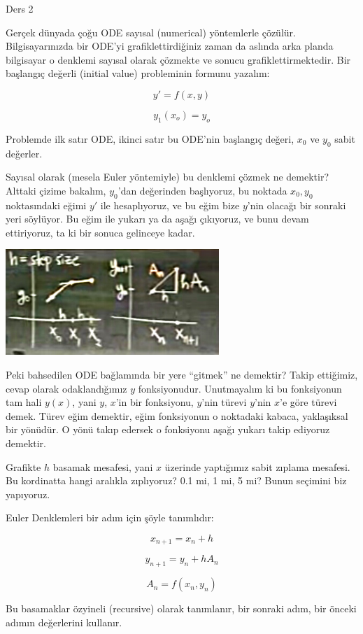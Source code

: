 \documentclass[12pt,fleqn]{article}\usepackage{../../common}
\begin{document}
Ders 2

Gerçek dünyada çoğu ODE sayısal (numerical) yöntemlerle
çözülür. Bilgisayarınızda bir ODE'yi grafiklettirdiğiniz zaman da aslında arka
planda bilgisayar o denklemi sayısal olarak çözmekte ve sonucu
grafiklettirmektedir. Bir başlangıç değerli (initial value) probleminin formunu
yazalım: 

$$
y' = f(x,y)
$$

$$
y_1(x_o) = y_o
$$

Problemde ilk satır ODE, ikinci satır bu ODE'nin başlangıç değeri, $x_0$ ve $y_0$
sabit değerler. 

Sayısal olarak (mesela Euler yöntemiyle) bu denklemi çözmek ne demektir?
Alttaki çizime bakalım, $y_0$'dan değerinden başlıyoruz, bu noktada
$x_0,y_0$ noktasındaki eğimi $y'$ ile hesaplıyoruz, ve bu eğim bize $y$'nin
olacağı bir sonraki yeri söylüyor. Bu eğim ile yukarı ya da aşağı
çıkıyoruz, ve bunu devam ettiriyoruz, ta ki bir sonuca gelinceye kadar.

\includegraphics[height=4cm]{2_1.jpg}

Peki bahsedilen ODE bağlamında bir yere ``gitmek'' ne demektir? Takip ettiğimiz,
cevap olarak odaklandığımız $y$ fonksiyonudur. Unutmayalım ki bu fonksiyonun tam
hali $y(x)$, yani $y$, $x$'in bir fonksiyonu, $y$'nin türevi $y$'nin $x$'e göre
türevi demek. Türev eğim demektir, eğim fonksiyonun o noktadaki kabaca,
yaklaşıksal bir yönüdür. O yönü takıp edersek o fonksiyonu aşağı yukarı takip
ediyoruz demektir.

Grafikte $h$ basamak mesafesi, yani $x$ üzerinde yaptığımız sabit zıplama
mesafesi. Bu kordinatta hangi aralıkla zıplıyoruz? 0.1 mi, 1 mi, 5 mi? Bunun
seçimini biz yapıyoruz. 

Euler Denklemleri bir adım için şöyle tanımlıdır:

$$ x_{n+1} = x_n + h $$

$$ y_{n+1} = y_n + hA_n $$

$$ A_n = f(x_n, y_n) $$

Bu basamaklar özyineli (recursive) olarak tanımlanır, bir sonraki adım, bir
önceki adımın değerlerini kullanır. 
\end{document}
